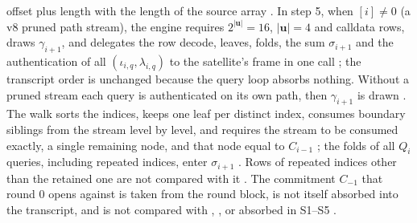 offset plus length with the length of the source array
.
In step 5, when $[i] \ne 0$ (a v8 pruned path stream), the
engine requires
$2^{|\mathbf u|} = 16$, $|\mathbf u| = 4$ and calldata rows, draws $\gamma_{i+1}$,
and delegates the row decode, leaves, folds, the sum $\sigma_{i+1}$ and the
authentication of all $(\iota_{i,q}, \lambda_{i,q})$ to the satellite's
 frame in one call ; the
transcript order is unchanged because the query loop absorbs nothing. Without a
pruned stream each query is authenticated on its own path, then $\gamma_{i+1}$ is
drawn . The  walk sorts the indices,
keeps one leaf per distinct index, consumes boundary siblings from the stream
level by level, and requires the stream to be consumed exactly, a single
remaining node, and that node equal to $C_{i-1}$
; the folds of all $Q_i$ queries, including
repeated indices, enter $\sigma_{i+1}$ . Rows of
repeated indices other than the retained one are not compared with it
. The commitment $C_{-1}$ that round $0$ opens against is taken from
the round block, is not itself absorbed into the transcript, and is not compared
with , ,  or 
absorbed in S1--S5 
.


